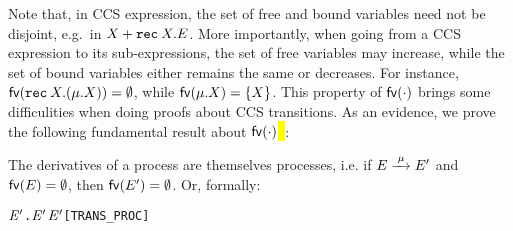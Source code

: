 Note that, in CCS expression, the set of free and bound
variables need not be disjoint, e.g.\ in  $X + {\tt rec}\: X . E$.
More importantly, when going
from a CCS expression to its sub-expressions, the set of free
variables may increase, while the set of bound variables either
remains the same or decreases. For instance, ${{\rm\sf{fv}}}({\tt rec}\: X . (\mu.X)) = \emptyset$, while
${{\rm\sf{fv}}}(\mu.X) = \{X\}$. This property of ${{\rm\sf{fv}}}(\cdot)$ brings some
difficulities when doing proofs about CCS transitions. As an evidence,
we prove the following fundamental result about ${{\rm\sf{fv}}}(\cdot)$\hl{\mbox{~\citep[p.~1209]{milner1990operational}}}:

\begin{proposition}
\label{prop:transFV}
The derivatives of a process are themselves processes, i.e.
if $E \arr{\mu} E'$ and ${{\rm\sf{fv}}}(E) = \emptyset$, then ${{\rm\sf{fv}}}(E') =
\emptyset$. Or, formally:
\begin{alltt}
\HOLTokenTurnstile{} \HOLSymConst{\HOLTokenForall{}}  \ensuremath{\HOLBoundVar{E}\sp{\prime}}.  \HOLTokenTransBegin{}\HOLTokenTransEnd \ensuremath{\HOLBoundVar{E}\sp{\prime}} \HOLSymConst{\HOLTokenConj{}}   \HOLSymConst{\HOLTokenImp{}}  \ensuremath{\HOLBoundVar{E}\sp{\prime}}\hfill{[TRANS_PROC]}
\end{alltt}
\end{proposition}

